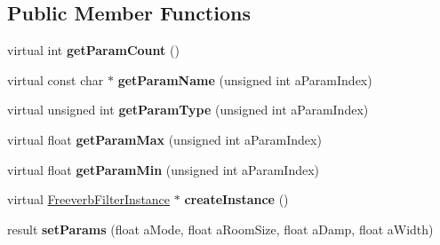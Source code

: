 \subsection*{Public Member Functions}
\begin{DoxyCompactItemize}
\item 
\mbox{\label{class_so_loud_1_1_freeverb_filter_aaf117b6ef9b19f61f3dbb80f883e0d5d}} 
virtual int {\bfseries get\+Param\+Count} ()
\item 
\mbox{\label{class_so_loud_1_1_freeverb_filter_ac6405f70a9fe58989cd044753676d5df}} 
virtual const char $\ast$ {\bfseries get\+Param\+Name} (unsigned int a\+Param\+Index)
\item 
\mbox{\label{class_so_loud_1_1_freeverb_filter_a5f500798467c45fe96a0e73f4312e846}} 
virtual unsigned int {\bfseries get\+Param\+Type} (unsigned int a\+Param\+Index)
\item 
\mbox{\label{class_so_loud_1_1_freeverb_filter_a02be09c8a65885cd00f0980c3e378774}} 
virtual float {\bfseries get\+Param\+Max} (unsigned int a\+Param\+Index)
\item 
\mbox{\label{class_so_loud_1_1_freeverb_filter_ab97893ceb5c0f3dfaf2cb52da30c3967}} 
virtual float {\bfseries get\+Param\+Min} (unsigned int a\+Param\+Index)
\item 
\mbox{\label{class_so_loud_1_1_freeverb_filter_ac0df05915a078052370b7ec1049c4c54}} 
virtual \mbox{\hyperlink{class_so_loud_1_1_freeverb_filter_instance}{Freeverb\+Filter\+Instance}} $\ast$ {\bfseries create\+Instance} ()
\item 
\mbox{\label{class_so_loud_1_1_freeverb_filter_a98eb51d20bf25a1ac46620e46e20ee2b}} 
result {\bfseries set\+Params} (float a\+Mode, float a\+Room\+Size, float a\+Damp, float a\+Width)
\end{DoxyCompactItemize}
